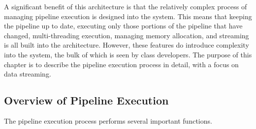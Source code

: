 A significant benefit of this architecture is that the relatively complex
process of managing pipeline execution is designed into the system. This
means that keeping the pipeline up to date, executing only those portions of
the pipeline that have changed, multi-threading execution, managing memory
allocation, and streaming is all built into the architecture. However, these
features do introduce complexity into the system, the bulk of which is seen
by class developers. The purpose of this chapter is to describe the pipeline
execution process in detail, with a focus on data streaming.


\subsection{Overview of Pipeline Execution}
\label{sec:OverviewPipelineExecution}

The pipeline execution process performs several important functions.

\begin{figure}
  \par\centering
  \label{fig:DataPipeLine}
  \par
\end{figure}

